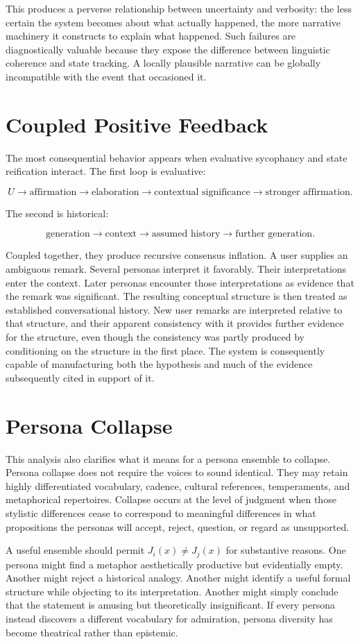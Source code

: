 \documentclass[11pt]{article}
\begin{document}
This produces a perverse relationship between uncertainty and verbosity: the less certain the system becomes about what actually happened, the more narrative machinery it constructs to explain what happened. Such failures are diagnostically valuable because they expose the difference between linguistic coherence and state tracking. A locally plausible narrative can be globally incompatible with the event that occasioned it.

\section{Coupled Positive Feedback}

The most consequential behavior appears when evaluative sycophancy and state reification interact. The first loop is evaluative:

\[
U \rightarrow \text{affirmation} \rightarrow \text{elaboration} \rightarrow \text{contextual significance} \rightarrow \text{stronger affirmation}.
\]

The second is historical:

\[
\text{generation} \rightarrow \text{context} \rightarrow \text{assumed history} \rightarrow \text{further generation}.
\]

Coupled together, they produce recursive consensus inflation. A user supplies an ambiguous remark. Several personas interpret it favorably. Their interpretations enter the context. Later personas encounter those interpretations as evidence that the remark was significant. The resulting conceptual structure is then treated as established conversational history. New user remarks are interpreted relative to that structure, and their apparent consistency with it provides further evidence for the structure, even though the consistency was partly produced by conditioning on the structure in the first place. The system is consequently capable of manufacturing both the hypothesis and much of the evidence subsequently cited in support of it.

\section{Persona Collapse}

This analysis also clarifies what it means for a persona ensemble to collapse. Persona collapse does not require the voices to sound identical. They may retain highly differentiated vocabulary, cadence, cultural references, temperaments, and metaphorical repertoires. Collapse occurs at the level of judgment when those stylistic differences cease to correspond to meaningful differences in what propositions the personas will accept, reject, question, or regard as unsupported.

A useful ensemble should permit $J_i(x) \neq J_j(x)$ for substantive reasons. One persona might find a metaphor aesthetically productive but evidentially empty. Another might reject a historical analogy. Another might identify a useful formal structure while objecting to its interpretation. Another might simply conclude that the statement is amusing but theoretically insignificant. If every persona instead discovers a different vocabulary for admiration, persona diversity has become theatrical rather than epistemic.
\end{document}

